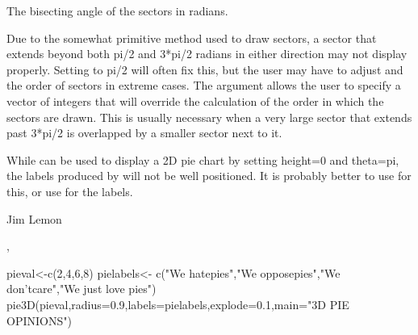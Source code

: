 \begin{Value}
The bisecting angle of the sectors in radians.
\end{Value}
\begin{Note}\relax
Due to the somewhat primitive method used to draw sectors, a sector that
extends beyond both pi/2 and 3*pi/2 radians in either direction may not
display properly. Setting  to pi/2 will often fix this, but
the user may have to adjust  and the order of sectors in extreme
cases. The argument  allows the user to specify a vector
of integers that will override the calculation of the order in which the
sectors are drawn. This is usually necessary when a very large sector that 
extends past 3*pi/2 is overlapped by a smaller sector next to it.

While  can be used to display a 2D pie chart by setting
height=0 and theta=pi, the labels produced by  will
not be well positioned. It is probably better to use 
for this, or use  for the labels.
\end{Note}
\begin{Author}\relax
Jim Lemon
\end{Author}
\begin{SeeAlso}\relax
{}, 
\end{SeeAlso}
\begin{Examples}
\begin{ExampleCode}
 pieval<-c(2,4,6,8)
 pielabels<-
  c("We hate\n pies","We oppose\n  pies","We don't\n  care","We just love pies")
 pie3D(pieval,radius=0.9,labels=pielabels,explode=0.1,main="3D PIE OPINIONS")
\end{ExampleCode}
\end{Examples}

